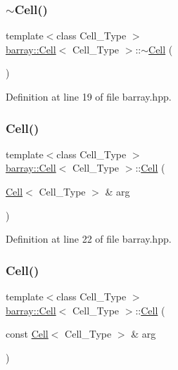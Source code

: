 \subsubsection{\texorpdfstring{$\sim$\+Cell()}{~Cell()}}
{\footnotesize\ttfamily template$<$class Cell\+\_\+\+Type $>$ \\
\hyperlink{classbarray_1_1_cell}{barray\+::\+Cell}$<$ Cell\+\_\+\+Type $>$\+::$\sim$\hyperlink{classbarray_1_1_cell}{Cell} (\begin{DoxyParamCaption}{ }\end{DoxyParamCaption})\hspace{0.3cm}{\ttfamily [inline]}}



Definition at line 19 of file barray.\+hpp.

\mbox{\label{classbarray_1_1_cell_aa86466ea836b425461c0b8ab5b785bc0}} 
\subsubsection{\texorpdfstring{Cell()}{Cell()}\hspace{0.1cm}{\footnotesize\ttfamily [4/6]}}
{\footnotesize\ttfamily template$<$class Cell\+\_\+\+Type $>$ \\
\hyperlink{classbarray_1_1_cell}{barray\+::\+Cell}$<$ Cell\+\_\+\+Type $>$\+::\hyperlink{classbarray_1_1_cell}{Cell} (\begin{DoxyParamCaption}\item[{\hyperlink{classbarray_1_1_cell}{Cell}$<$ Cell\+\_\+\+Type $>$ \&}]{arg }\end{DoxyParamCaption})\hspace{0.3cm}{\ttfamily [inline]}}



Definition at line 22 of file barray.\+hpp.

\mbox{\label{classbarray_1_1_cell_aedb8cec82e7940182532da7e0d199bc7}} 
\subsubsection{\texorpdfstring{Cell()}{Cell()}\hspace{0.1cm}{\footnotesize\ttfamily [5/6]}}
{\footnotesize\ttfamily template$<$class Cell\+\_\+\+Type $>$ \\
\hyperlink{classbarray_1_1_cell}{barray\+::\+Cell}$<$ Cell\+\_\+\+Type $>$\+::\hyperlink{classbarray_1_1_cell}{Cell} (\begin{DoxyParamCaption}\item[{const \hyperlink{classbarray_1_1_cell}{Cell}$<$ Cell\+\_\+\+Type $>$ \&}]{arg }\end{DoxyParamCaption})\hspace{0.3cm}{\ttfamily [inline]}}



